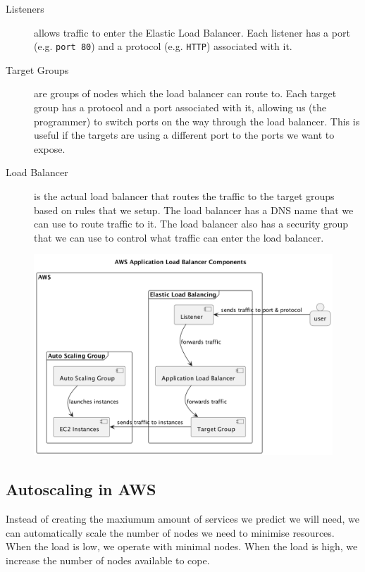\documentclass{csse4400}
\begin{document}
\begin{description}
  \item[Listeners] allows traffic to enter the Elastic Load Balancer.
  Each listener has a port (e.g. \texttt{port 80}) and a protocol (e.g. \texttt{HTTP}) associated with it.
  \item[Target Groups] are groups of nodes which the load balancer can route to. 
      Each target group has a protocol and a port associated with it, allowing us (the programmer) to switch ports on the way through the load balancer.
      This is useful if the targets are using a different port to the ports we want to expose.
  \item[Load Balancer] is the actual load balancer that routes the traffic to the target groups based on rules that we setup.
      The load balancer has a DNS name that we can use to route traffic to it.
      The load balancer also has a security group that we can use to control what traffic can enter the load balancer. 
\end{description}

\begin{figure}[H]
  \includegraphics[width=\textwidth]{diagrams/loadbalancers}
\end{figure}

\subsection{Autoscaling in AWS}
Instead of creating the maxiumum amount of services we predict we will need,
we can automatically scale the number of nodes we need to minimise resources.
When the load is low, we operate with minimal nodes.
When the load is high, we increase the number of nodes available to cope.
\end{document}
